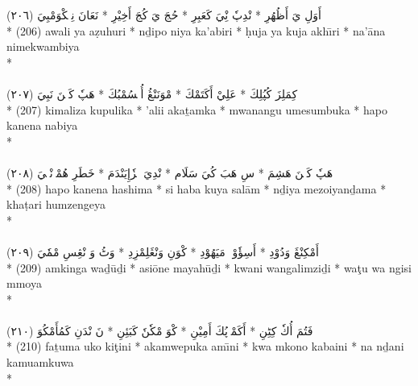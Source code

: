 \documentclass[a4paper, 12pt]{report}
\begin{document}
\begin{center}
\textarabic{(٢٠٦) \textcolor{mygreen}{أَوَلِ يَ أَظُهُرِ  * نْدِپٗ نِْيَ كَعَبِرِ  * حُجَ يَ كُجَ أَخِيْرِ  * نَعَانَ نِمٖكْوَمْبِيَ }} \\* 
(206) awali ya aẓuhuri  * nḏipo niya ka'abiri  * ḥuja ya kuja akhı̄ri  * na'āna nimekwambiya  \\* 
 \\ 
\\[8mm] 

\textarabic{(٢٠٧) \textcolor{mygreen}{كِمَلِزَ كُپُلِكَ  * عَلِيْ أَكَتَمْكَ  * مْوَنَنْڠُ أُمٖسُمْبُكَ  * هَپٗ كَنٖنَ نَبِيَ }} \\* 
(207) kimaliza kupulika  * 'alii akaṯamka  * mwanangu umesumbuka  * hapo kanena nabiya  \\* 
 \\ 
\\[8mm] 

\textarabic{(٢٠٨) \textcolor{mygreen}{هَپٗ كَنٖنَ هَشِمَ  * سِ هَبَ كُيَ سَلَام  * نْدِيَ مٖزٗإِيَنْدَمَ  * خَطَرِ هُمْزٖنْڠٖيَ }} \\* 
(208) hapo kanena hashima  * si haba kuya salām  * nḏiya mezoiyanḏama  * khaṭari humzengeya  \\* 
 \\ 
\\[8mm] 

\textarabic{(٢٠٩) \textcolor{mygreen}{أَمْكِنْڠَ وَدُوْدِ  * أَسِؤٗوْنٖ مَيَهُوْدِ  * كْوَنِ وَنْڠَلِمْزِدِ  * وَٹُ وَ نْڠِسِ مْمٗيَ }} \\* 
(209) amkinga waḏūḏi  * asiōne mayahūḏi  * kwani wangalimziḏi  * waţu wa ngisi mmoya  \\* 
 \\ 
\\[8mm] 

\textarabic{(٢١٠) \textcolor{mygreen}{فَتُمَ أُكٗ كِٹِنِ  * أَكَمْوٖپُكَ أَمِيْنِ  * كْوَ مْكٗنٗ كَبَئِنِ  * نَ نْدَنِ كَمُأَمْكُوَ }} \\* 
(210) faṯuma uko kiţini  * akamwepuka amı̄ni  * kwa mkono kabaini  * na nḏani kamuamkuwa  \\* 
 \\ 
\\[8mm] 


\end{center}
\end{document}
